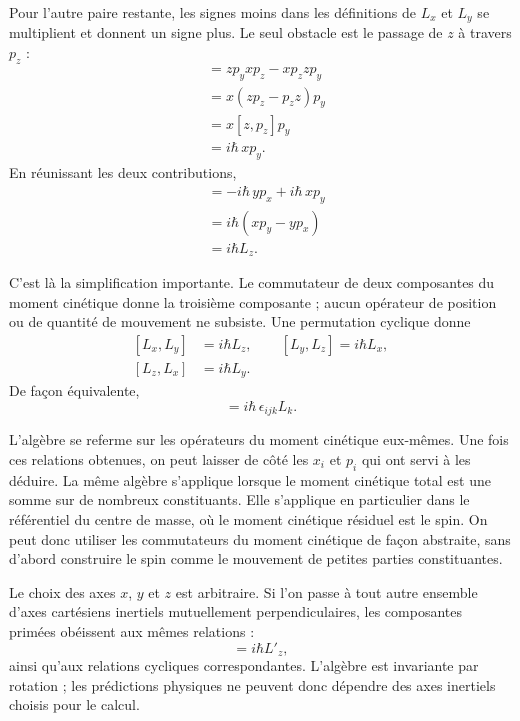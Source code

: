 Pour l’autre paire restante, les signes moins dans les définitions de \(L_x\) et \(L_y\) se multiplient et donnent un signe plus. Le seul obstacle est le passage de \(z\) à travers \(p_z\) :
\begin{align}
[zp_y,xp_z]
&=zp_yxp_z-xp_zzp_y \\
&=x(zp_z-p_zz)p_y \\
&=x[z,p_z]p_y \\
&=i\hbar\,xp_y.
\end{align}
En réunissant les deux contributions,
\begin{align}
[L_x,L_y]
&=-i\hbar\,yp_x+i\hbar\,xp_y \\
&=i\hbar(xp_y-yp_x) \\
&=i\hbar L_z.
\end{align}

C’est là la simplification importante. Le commutateur de deux composantes du moment cinétique donne la troisième composante ; aucun opérateur de position ou de quantité de mouvement ne subsiste. Une permutation cyclique donne
\begin{equation}
\begin{aligned}
[L_x,L_y]&=i\hbar L_z,\qquad
[L_y,L_z]=i\hbar L_x,\\
[L_z,L_x]&=i\hbar L_y.
\end{aligned}
\end{equation}
De façon équivalente,
\begin{equation}
[L_i,L_j]=i\hbar\,\epsilon_{ijk}L_k.
\end{equation}

L’algèbre se referme sur les opérateurs du moment cinétique eux-mêmes. Une fois ces relations obtenues, on peut laisser de côté les \(x_i\) et \(p_i\) qui ont servi à les déduire. La même algèbre s’applique lorsque le moment cinétique total est une somme sur de nombreux constituants. Elle s’applique en particulier dans le référentiel du centre de masse, où le moment cinétique résiduel est le spin. On peut donc utiliser les commutateurs du moment cinétique de façon abstraite, sans d’abord construire le spin comme le mouvement de petites parties constituantes.

Le choix des axes \(x\), \(y\) et \(z\) est arbitraire. Si l’on passe à tout autre ensemble d’axes cartésiens inertiels mutuellement perpendiculaires, les composantes primées obéissent aux mêmes relations :
\begin{equation}
[L'_x,L'_y]=i\hbar L'_z,
\end{equation}
ainsi qu’aux relations cycliques correspondantes. L’algèbre est invariante par rotation ; les prédictions physiques ne peuvent donc dépendre des axes inertiels choisis pour le calcul.

